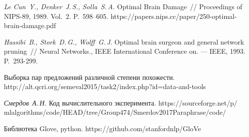 \documentclass[12pt, fleqn, unicode]{article}
\begin{document}
\begin{thebibliography}{99}
	\textit{Le Cun~Y., Denker~J.\,S., Solla~S.\,A.} Optimal Brain Damage~// Proceedings of NIPS-89, 1989. Vol.~2. P.~598--605. {\ttfamily https://papers.nips.cc/paper/250-optimal-brain-damage.pdf}
	
	\textit{Hassibi~B., Stork~D.\,G., Wolff~G.\,J}. Optimal brain surgeon and general network pruning~// Neural Networks., IEEE International Conference on. --- IEEE, 1993. P.~293-299.
	
	Выборка пар предложений различной степени похожести. {\ttfamily  http://alt.qcri.org/semeval2015/task2/index.php?id=data-and-tools}
	
	
	\textit{Смердов~А.\,Н.} Код вычислительного эксперимента. {\ttfamily 
		https://sourceforge.net/p/
		mlalgorithms/code/HEAD/tree/Group474/Smerdov2017Paraphrase/code/}
	
	Библиотека Glove, python.
	{\ttfamily https://github.com/stanfordnlp/GloVe}

\end{thebibliography}
\end{document}
